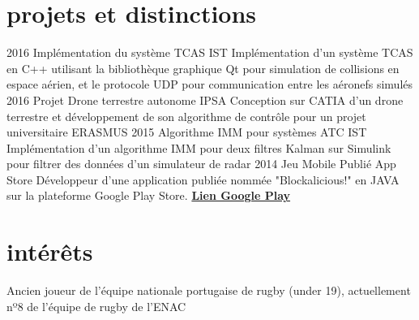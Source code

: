 \documentclass[a4paper]{friggeri-cv} %
\begin{document}
\section{projets et distinctions}

\begin{entrylist}



\entry
{2016}
{Implémentation du système TCAS}
{IST}
{Implémentation d'un système TCAS en C++ utilisant la bibliothèque graphique Qt pour simulation de collisions en espace aérien, et le protocole UDP pour communication entre les aéronefs simulés}
\entry
{2016}
{Projet Drone terrestre autonome}
{IPSA}
{Conception sur CATIA d'un drone terrestre et développement de son algorithme de contrôle pour un projet universitaire ERASMUS}
\entry
{2015}
{Algorithme IMM pour systèmes ATC}
{IST}
{Implémentation d'un algorithme IMM pour deux filtres Kalman sur Simulink pour filtrer des données d'un simulateur de radar}
\entry
{2014}
{Jeu Mobile Publié}
{App Store}
{Développeur d'une application publiée nommée "Blockalicious!" en JAVA sur la plateforme Google Play Store.
\href{https://play.google.com/store/apps/details?id=com.guiero.blockaliciousfinal}{\textbf{Lien Google Play}}}
\end{entrylist}




\section{intérêts}

Ancien joueur de l'équipe nationale portugaise de rugby (under 19), actuellement nº8 de l'équipe de rugby de l'ENAC

\end{document}
